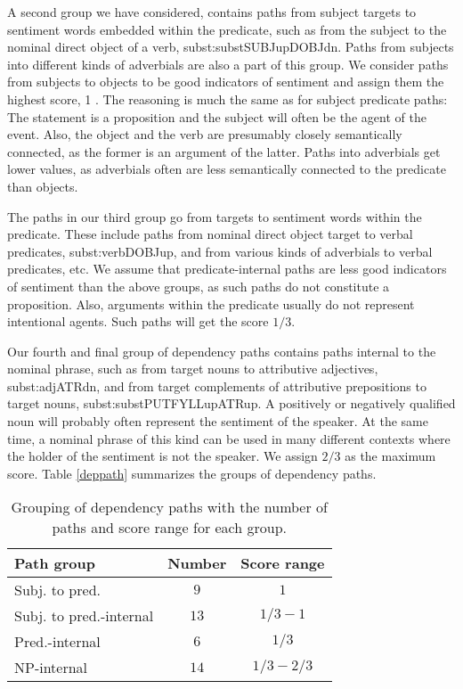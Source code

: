 \documentclass[11pt]{article}
\begin{document}
A second group we have considered, contains paths from subject targets to sentiment words embedded within the predicate, such as from the subject to the nominal direct object of a verb, subst:subst{\textunderscore}{\textunderscore}SUBJ{\textunderscore}up{\textunderscore}{\textunderscore}DOBJ{\textunderscore}dn. Paths from subjects into different kinds of adverbials are also a part of this group. We consider paths from subjects to objects to be good indicators of sentiment and assign them the highest score, 1
. The reasoning is much the same as for subject predicate paths: The statement is a proposition and the subject will often be the agent of the event. Also, the object and the verb are presumably closely semantically connected, as the former is an argument of the latter.  Paths into adverbials get lower values, as adverbials often are less semantically connected to the predicate than objects.

The paths in our third group go from targets to sentiment words within the predicate. These include paths from nominal direct object target to verbal predicates, subst:verb{\textunderscore}{\textunderscore}DOBJ{\textunderscore}up, and from various kinds of adverbials to verbal predicates, etc. We assume that predicate-internal paths are less good indicators of sentiment than the above groups, as such paths do not constitute a proposition. Also, arguments within the predicate usually do not represent intentional agents. Such paths will get the score $1/3$.

Our fourth and final group of dependency paths contains paths internal to the nominal phrase, such as from target nouns to attributive adjectives, subst:adj{\textunderscore}{\textunderscore}ATR{\textunderscore}dn, and from target complements of attributive prepositions to target nouns, subst:subst{\textunderscore}{\textunderscore}PUTFYLL{\textunderscore}up{\textunderscore}{\textunderscore}ATR{\textunderscore}up. A positively or negatively qualified noun will probably often represent the sentiment of the speaker. At the same time, a nominal phrase of this kind can be used in many different contexts where the holder of the sentiment is not the speaker. We assign $2/3$ as the maximum score. Table \ref{deppath} summarizes the groups of dependency paths.
\begin{table}[h]
\begin{center}
\begin{tabular}{|l|cc|}
\hline \bf Path group & \bf Number & \bf Score range \\ \hline
Subj. to pred. & $9$ & $1$ \\
Subj. to pred.-internal & $13$ & $1/3-1$ \\
Pred.-internal & $6$ & $1/3$ \\
NP-internal & $14$ & $1/3-2/3$ \\
\hline
\end{tabular}
\end{center}
\caption{\label{deppath} Grouping of dependency paths with the number of paths and score range for each group.}
\label{tab:paths}
\end{table}
\end{document}
